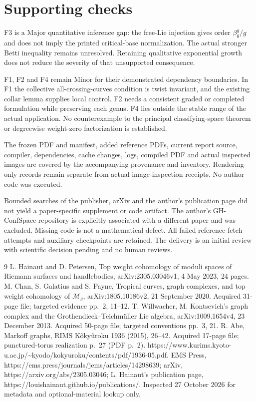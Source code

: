 \documentclass[10pt]{article}
\begin{document}
\section*{Supporting checks}
F3 is a Major quantitative inference gap: the free-Lie injection gives order \(\beta_0^g/g\) and does not imply the printed critical-base normalization. The actual stronger Betti inequality remains unresolved. Retaining qualitative exponential growth does not reduce the severity of that unsupported consequence.\par
F1, F2 and F4 remain Minor for their demonstrated dependency boundaries. In F1 the collective all-crossing-curves condition is twist invariant, and the existing collar lemma supplies local control. F2 needs a consistent graded or completed formulation while preserving each genus. F4 lies outside the stable range of the actual application. No counterexample to the principal classifying-space theorem or degreewise weight-zero factorization is established.\par
The frozen PDF and manifest, added reference PDFs, current report source, compiler, dependencies, cache changes, logs, compiled PDF and actual inspected images are covered by the accompanying provenance and inventory. Rendering-only records remain separate from actual image-inspection receipts. No author code was executed.\par
Bounded searches of the publisher, arXiv and the author’s publication page did not yield a paper-specific supplement or code artifact. The author’s GH-ConfSpace repository is explicitly associated with a different paper and was excluded. Missing code is not a mathematical defect. All failed reference-fetch attempts and auxiliary checkpoints are retained. The delivery is an initial review with scientific decision pending and no human reviews.\par
9 L. Hainaut and D. Petersen, Top weight cohomology of moduli spaces of Riemann surfaces and handlebodies, arXiv:2305.03046v1, 4 May 2023, 24 pages. M. Chan, S. Galatius and S. Payne, Tropical curves, graph complexes, and top weight cohomology of \(\mathcal M_g\), arXiv:1805.10186v2, 21 September 2020. Acquired 31-page file; targeted evidence pp. 2, 11–12. T. Willwacher, M. Kontsevich’s graph complex and the Grothendieck–Teichmüller Lie algebra, arXiv:1009.1654v4, 23 December 2013. Acquired 50-page file; targeted conventions pp. 3, 21. R. Abe, Markoff graphs, RIMS Kôkyûroku 1936 (2015), 26–42. Acquired 17-page file; punctured-torus realization p. 27 (PDF p. 2). https://www.kurims.kyoto-u.ac.jp/\textasciitilde{}kyodo/kokyuroku/contents/pdf/1936-05.pdf. EMS Press, https://ems.press/journals/jems/articles/14298639; arXiv, https://arxiv.org/abs/2305.03046; L. Hainaut’s publication page, https://louishainaut.github.io/publications/. Inspected 27 October 2026 for metadata and optional-material lookup only.\par
\end{document}
